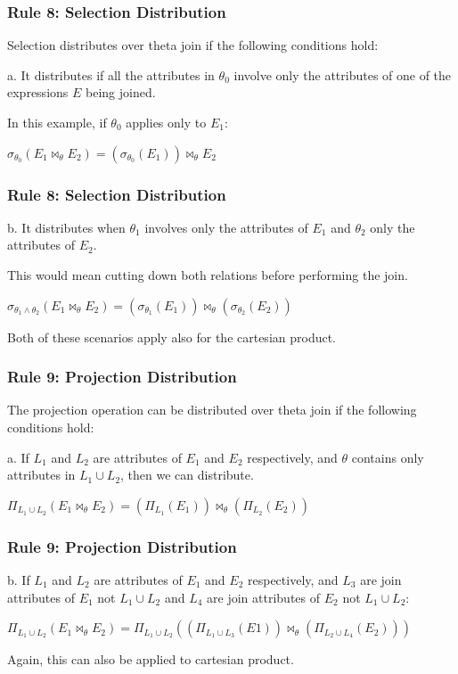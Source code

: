 \begin{frame}
\frametitle{Rule 8: Selection Distribution}

Selection distributes over theta join if the following conditions hold:

a. It distributes if all the attributes in $\theta_{0}$ involve only the attributes of one of the expressions $E$ being joined. 

 In this example, if $\theta_{0}$ applies only to $E_{1}$:

$\sigma_{\theta_{0}}(E_{1} \bowtie_{\theta} E_{2}) = (\sigma_{\theta_{0}}(E_{1})) \bowtie_{\theta} E_{2}$ 


\end{frame}

\begin{frame}
\frametitle{Rule 8: Selection Distribution}

b. It distributes when $\theta_{1}$ involves only the attributes of $E_{1}$ and $\theta_{2}$ only the attributes of $E_{2}$. 

This would mean cutting down both relations before performing the join.

$\sigma_{\theta_{1}\wedge\theta_{2}} (E_{1} \bowtie_{\theta} E_{2}) = (\sigma_{\theta_{1}}(E_{1})) \bowtie_{\theta} (\sigma_{\theta_{2}}(E_{2})) $

Both of these scenarios apply also for the cartesian product.

\end{frame}


\begin{frame}
\frametitle{Rule 9: Projection Distribution}

The projection operation can be distributed over theta join if the following conditions hold:

a. If $L_{1}$ and $L_{2}$ are attributes of $E_{1}$ and $E_{2}$ respectively, and $\theta$ contains only attributes in $L_{1} \cup L_{2}$, then we can distribute. 

$\Pi_{L_{1} \cup L_{2}}( E_{1} \bowtie_{\theta} E_{2} ) = (\Pi_{L_{1}}(E_{1})) \bowtie_{\theta} (\Pi_{L_{2}}(E_{2}))$

\end{frame}



\begin{frame}
\frametitle{Rule 9: Projection Distribution}

b. If $L_{1}$ and $L_{2}$ are attributes of $E_{1}$ and $E_{2}$ respectively, and $L_{3}$ are join attributes of $E_{1}$ not $L_{1} \cup L_{2}$ and $L_{4}$ are join attributes of $E_{2}$ not $L_{1} \cup L_{2}$:

$\Pi_{L_{1} \cup L_{2}} (E_{1} \bowtie_{\theta} E_{2}) = \Pi_{L_{1} \cup L_{2}}((\Pi_{L_{1} \cup L_{3}}(E1)) \bowtie_{\theta} (\Pi_{L_{2} \cup L_{4}}(E_{2})))$

Again, this can also be applied to cartesian product.


\end{frame}


